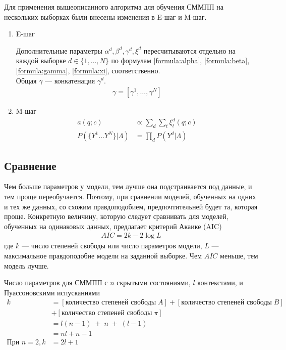 \documentclass{matmex-diploma-custom}
\begin{document}
Для применения вышеописанного алгоритма для обучения СММПП на нескольких выборках были внесены изменения в E-шаг и M-шаг.
\\
\begin{enumerate}
\item E-шаг

Дополнительные параметры $\alpha^{d}, \beta^{d}, \gamma^{d}, \xi^{d}$ пересчитываются отдельно на каждой выборке $d \in \{1, \ldots, N\}$ по формулам
\ref{formula:alpha}, \ref{formula:beta}, \ref{formula:gamma}, \ref{formula:xi}, соответственно.
\\
Общая $\gamma$ --- конкатенация $\gamma^{d}$.
\begin{align}
\gamma = [\gamma^{1}, \ldots ,\gamma^{N}] 
\end{align}
\item M-шаг
\begin{align}
a(q; c) &\propto \sum_{d}{\sum_{t}{\xi^{d}_{t}(q;c)}} \\ 
P(\{Y^{1} \ldots Y^{N}\}|\Lambda) &= \prod_{d}{P(Y^{d}|\Lambda)}
\end{align}

\end{enumerate}

\subsection{Сравнение}
Чем больше параметров у модели, тем лучше она подстраивается под данные, и тем проще переобучается. 
Поэтому, при сравнении моделей, обученных на одних и тех же данных, со схожим правдоподобием, предпочтительней будет та, которая проще. 
Конкретную величину, которую следует сравнивать для моделей, обученных на одинаковых данных, предлагает критерий Акаике (AIC)
\begin{align}
AIC = 2k-2\log{L}
\end{align}
где $ k $ --- число степеней свободы или число параметров модели, $ L $ --- максимальное правдоподобие модели на заданной выборке. Чем $AIC$ меньше, тем модель лучше. 

Число параметров для СММПП с $ n $ скрытыми состояниями, $ l $ контекстами, и Пуассоновскими испусканиями 
\begin{align}
k &= [\text{количество степеней свободы} \; A ] \nonumber
+ [\text{количество степеней свободы} \; B ] \nonumber
\\&+ [\text{количество степеней свободы} \; \pi ] \nonumber
\\ &= l(n-1)\;+\;n\;+\;(l-1) \nonumber\\&= nl + n - 1
\\ 
\text{При } n=2, k &= 2l + 1 \nonumber
\end{align}
\end{document}
